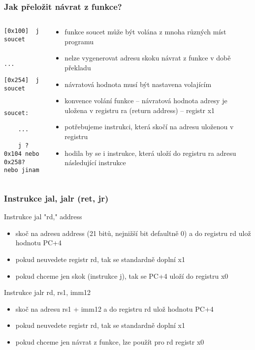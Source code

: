 \documentclass{beamer}
\begin{document}
\begin{frame}[fragile]
\frametitle{Jak přeložit návrat z funkce?}

\begin{columns}
\begin{column}{0.3\textwidth}  
\begin{verbatim}
[0x100]  j  soucet
         
         ...
         
[0x254]  j  soucet
    

soucet:

    ...
    
    j ? 
0x104 nebo 0x258?
nebo jinam
\end{verbatim}
\end{column}
\begin{column}{0.7\textwidth}
\begin{itemize}
 \item funkce soucet může být volána z mnoha různých míst programu
 \item nelze vygenerovat adresu skoku návrat z funkce v době překladu
 \item návratová hodnota musí být nastavena volajícím
 \item konvence volání funkce -- návratová hodnota adresy je uložena v registru ra (return address) -- registr x1
 \item potřebujeme instrukci, která skočí na adresu uloženou v registru
 \item hodila by se i instrukce, která uloží do registru ra adresu následující instrukce
\end{itemize}
\end{column}
\end{columns}
\end{frame}



\begin{frame}
\frametitle{Instrukce jal, jalr (ret, jr)}

Instrukce jal "rd," address
\begin{itemize}
 \item skoč na adresu address (21 bitů, nejnižší bit defaultně 0) a do registru rd ulož hodnotu PC+4
 \item pokud neuvedete registr rd, tak se standardně doplní x1
 \item pokud chceme jen skok (instrukce j), tak se PC+4 uloží do registru x0
\end{itemize}

Instrukce jalr rd, rs1, imm12
\begin{itemize}
 \item skoč na adresu rs1 + imm12 a do registru rd ulož hodnotu PC+4
 \item pokud neuvedete registr rd, tak se standardně doplní x1
 \item pokud chceme jen návrat z funkce, lze použít pro rd registr x0
\end{itemize}
\end{frame}
\end{document}
